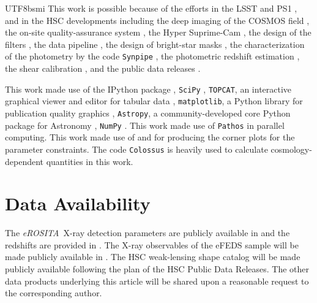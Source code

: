 \documentclass[longauth]{aa}
\newcommand{\eROSITA}{\emph{eROSITA}}
\begin{document}
\begin{CJK*}{UTF8}{bsmi}
This work is possible because of the efforts in the LSST \citep{juric17,ivezic19} and PS1 \citep{chambers16, schlafly12, tonry12, magnier13}, and in the HSC \citep{aihara18a} developments including the deep imaging of the COSMOS field \citep{tanaka17}, the on-site quality-assurance system \citep{furusawa18}, the Hyper Suprime-Cam \citep{miyazaki15, miyazaki18, komiyama18}, the design of the filters \citep{kawanomoto18},  the data pipeline \citep{bosch18}, the design of bright-star masks \citep{coupon18}, the characterization of the photometry by the code \texttt{Synpipe} \citep{huang18}, the photometric redshift estimation \citep{tanaka18}, the shear calibration \citep{mandelbaum18}, and the public data releases \citep{aihara18b, aihara19}.


This work made use of the IPython package \citep{PER-GRA:2007}, \texttt{SciPy} \citep{virtanen_scipy}, \texttt{TOPCAT}, an interactive graphical viewer and editor for tabular data \citep{topcat1,topcat2}, \texttt{matplotlib}, a Python library for publication quality graphics \citep{Hunter:2007}, \texttt{Astropy}, a community-developed core Python package for Astronomy \citep{2013A&A...558A..33A}, \texttt{NumPy} \citep{van2011numpy}. 
This work made use of \texttt{Pathos} \citep{pathos} in parallel computing. 
This work made use of \citet{bocquet16b} and \cite{hinton2016} for producing the corner plots for the parameter constraints.
The code \texttt{Colossus} \citep{diemer18} is heavily used to calculate cosmology-dependent quantities in this work.


%
%


\section*{Data Availability}
\label{sec:data_availability}

The \eROSITA\ X-ray detection parameters are publicly available in \cite{liu21} and the redshifts are provided in \cite{klein21}.
The X-ray observables of the eFEDS sample will be made publicly available in \cite{bahar21}.
The HSC weak-lensing shape catalog will be made publicly available following the plan of the HSC Public Data Releases.
The other data products underlying this article will be shared upon a reasonable request to the corresponding author.



%
%


\end{CJK*}
\end{document}

